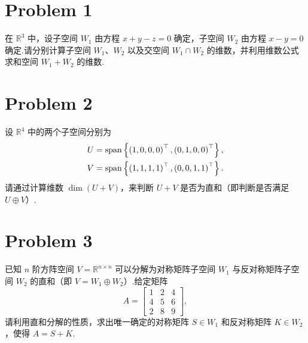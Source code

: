 \section*{Problem 1}

在 $\mathbb{R}^3$ 中，设子空间 $W_1$ 由方程 $x+y-z=0$ 确定，子空间 $W_2$ 由方程 $x-y=0$ 确定.请分别计算子空间 $W_1$、$W_2$ 以及交空间 $W_1 \cap W_2$ 的维数，并利用维数公式求和空间 $W_1 + W_2$ 的维数.

\section*{Problem 2}

设 $\mathbb{R}^4$ 中的两个子空间分别为
\[
\begin{aligned}
    U &= \mathrm{span}\left\{
    \left(1, 0, 0, 0\right)^\top,
    \left(0, 1, 0, 0\right)^\top
    \right\}, \\
    V &= \mathrm{span}\left\{
    \left(1, 1, 1, 1\right)^\top,
    \left(0, 0, 1, 1\right)^\top
    \right\}.
\end{aligned}
\]
请通过计算维数 $\dim \left(U + V\right)$，来判断 $U + V$ 是否为直和（即判断是否满足 $U \oplus V$）.

\section*{Problem 3}

已知 $n$ 阶方阵空间 $V = \mathbb{R}^{n \times n}$ 可以分解为对称矩阵子空间 $W_1$ 与反对称矩阵子空间 $W_2$ 的直和（即 $V = W_1 \oplus W_2$）.给定矩阵
\[
A =
\begin{bmatrix}
1 & 2 & 4 \\
4 & 5 & 6 \\
2 & 8 & 9
\end{bmatrix},
\]
请利用直和分解的性质，求出唯一确定的对称矩阵 $S \in W_1$ 和反对称矩阵 $K \in W_2$，使得 $A = S + K$.
